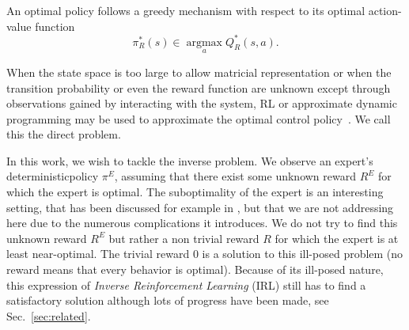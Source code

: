 \documentclass[smallextended]{svjour3}
\newcommand{\argmax}{\operatorname*{argmax}} %
\begin{document}
An optimal policy follows a greedy mechanism with respect to its optimal action-value function 
\begin{equation}
  \label{eq:greedy}
  \pi^*_R(s)\in\argmax_aQ^*_R(s,a).
\end{equation}

When the state space is too large to allow matricial representation or when the transition probability or even the reward function are unknown except through observations gained by interacting with the system, RL or approximate dynamic programming may be used to approximate the optimal control policy~\cite{sutton1998reinforcement}. We call this the direct problem.

In this work, we wish to tackle the inverse problem. We observe an expert's deterministic\footnotemark[\value{footnote}] policy $\pi^E$, assuming that there exist some unknown reward $R^E$ for which the expert is optimal. The suboptimality of the expert is an interesting setting, that has been discussed for example in \cite{melo2010analysis,syed2012reduction}, but that we are not addressing here due to the numerous complications it introduces. We do not try to find this unknown reward $R^E$ but rather a non trivial reward $R$ for which the expert is at least near-optimal. The trivial reward $0$ is a solution to this ill-posed problem (no reward means that every behavior is optimal). Because of its ill-posed nature, this expression of \emph{Inverse Reinforcement Learning} (IRL) still has to find a satisfactory solution although lots of progress have been made, see Sec.~\ref{sec:related}.
\end{document}
